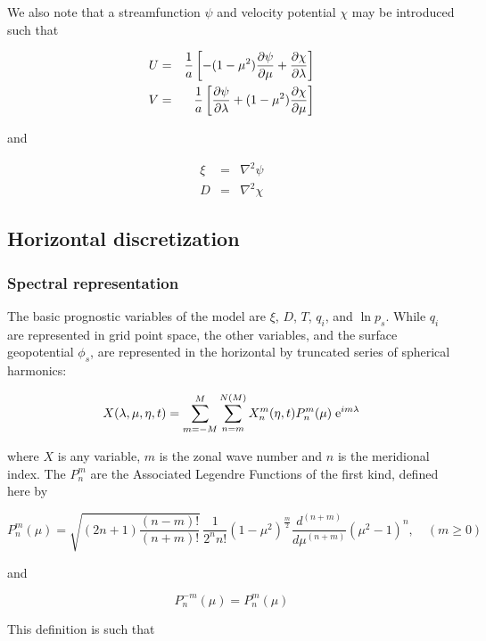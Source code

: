 We also note that a streamfunction $\psi$ and velocity potential
$\chi$ may be introduced such that

\begin{eqnarray}
U & = & \frac{1}{a}\left[-(1-\mu^2)\frac {\partial \psi} {\partial \mu}+\frac {\partial \chi} {\partial \lambda}\right]
\nonumber\\
V & = & \frac{1}{a}\left[\frac {\partial \psi} {\partial \lambda}+(1-\mu^2)\frac {\partial \chi} {\partial \mu}\right]
\label{(2.2.22)}
\end{eqnarray}

and

\begin{eqnarray}
\xi & = & \nabla^2\psi \nonumber\\
D   & = & \nabla^2\chi
\label{(2.2.22a)}
\end{eqnarray}

\subsection{\label{sec:hordis}Horizontal discretization}

\subsubsection{Spectral representation} 

The basic prognostic variables of the model are $\xi$, $D$, $T$,
$q_i$, and $\ln p_s$. While $q_i$ are represented in grid point space,
the other variables, and the surface geopotential $\phi_s$, are
represented in the horizontal by truncated series of spherical
harmonics:

\begin{equation}
X(\lambda,\mu,\eta,t) = \sum\limits_{m = -M}^M \sum\limits_{n=m}^{N(M)}
X_n^m(\eta,t) P_n^m(\mu)\;\mbox{e}^{im\lambda}
\label{(2.3.1.1)} 
\end{equation}

where $X$ is any variable, $m$ is the zonal wave number and $n$ is the
meridional index. The $P_n^m$ are the Associated Legendre Functions of the
first kind, defined here by

\begin{equation}
P_n^m(\mu) = \sqrt{(2n+1)\frac{(n-m)!}{(n+m)!}}\,\frac{1}{2^nn!}
(1-\mu^2)^{\frac{m}{2}} \frac{d^{(n+m)}}{d\mu^{(n+m)}}(\mu^2-1)^n, 
\quad (m \ge 0)
\label{(2.3.1.2)}
\end{equation}

and

\[
P_n^{-m}(\mu) = P_n^m(\mu)
\]

This definition is such that

